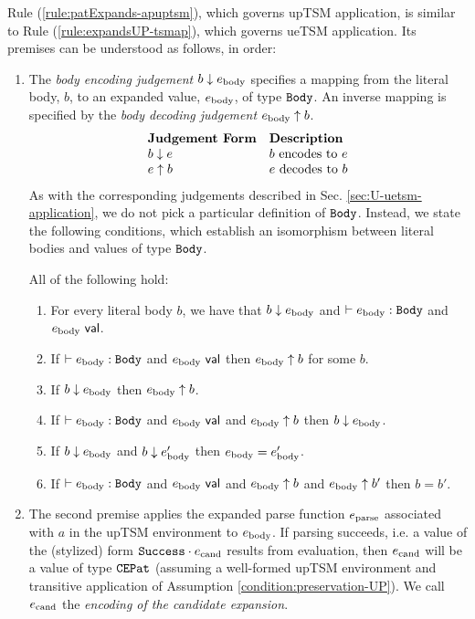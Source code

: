 {{{{Rule (\ref{rule:patExpands-apuptsm}), which governs upTSM application, is similar to Rule (\ref{rule:expandsUP-tsmap}), which governs ueTSM application. Its premises can be understood as follows, in order:
\begin{enumerate}
\item The \emph{body encoding judgement} $b \downarrow e_\text{body}$ specifies a mapping from the literal body, $b$, to an expanded value, $e_\text{body}$, of type $\mathtt{Body}$. An inverse mapping is specified by the \emph{body decoding judgement} $e_\text{body} \uparrow b$.
\[\begin{array}{ll}
\textbf{Judgement Form} & \textbf{Description}\\
b \downarrow e & \text{$b$ encodes to $e$}\\
e \uparrow b & \text{$e$ decodes to $b$}
\end{array}\]
As with the corresponding judgements described in Sec. \ref{sec:U-uetsm-application}, we do not pick a particular definition of $\mathtt{Body}$. Instead, we state the following conditions, which establish an isomorphism between literal bodies and values of type $\mathtt{Body}$.
\begin{condition} All of the following hold:
\begin{enumerate}
\item For every literal body $b$, we have that $b \downarrow e_\text{body}$ and $\vdash e_\text{body} : \mathtt{Body}$ and $e_\text{body}~\mathsf{val}$.
\item If $\vdash e_\text{body} : \mathtt{Body}$ and $e_\text{body}~\mathsf{val}$ then $e_\text{body} \uparrow b$ for some $b$.
\item If $b \downarrow e_\text{body}$ then $e_\text{body} \uparrow b$.
\item If $\vdash e_\text{body} : \mathtt{Body}$ and $e_\text{body}~\mathsf{val}$ and $e_\text{body} \uparrow b$ then $b \downarrow e_\text{body}$. 
\item If $b \downarrow e_\text{body}$ and $b \downarrow e_\text{body}'$ then $e_\text{body} = e_\text{body}'$.
\item If $\vdash e_\text{body} : \mathtt{Body}$ and $e_\text{body}~\mathsf{val}$ and $e_\text{body} \uparrow b$ and $e_\text{body} \uparrow b'$ then $b=b'$.
\end{enumerate}
\end{condition}
\item The second premise applies the expanded parse function $e_\text{parse}$ associated with $a$ in the upTSM environment to $e_\text{body}$. If parsing succeeds, i.e. a value of the (stylized) form $\mathtt{Success} \cdot e_\text{cand}$ results from evaluation, then $e_\text{cand}$ will be a value of type $\mathtt{CEPat}$ (assuming a well-formed upTSM environment and transitive application of Assumption \ref{condition:preservation-UP}). We call $e_\text{cand}$ the \emph{encoding of the candidate expansion}.


\end{enumerate}}}}}
